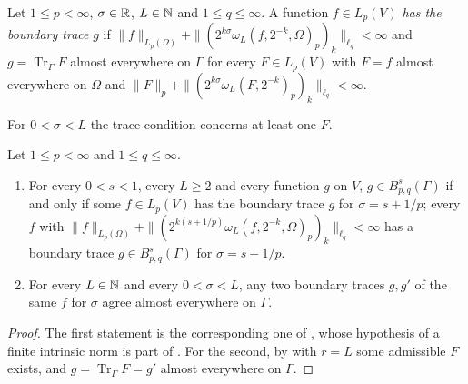 \begin{definition}
\label{def:boundary-trace-finite-norm}
\leanok
{}
Let $1 \leq p < \infty$, $\sigma \in \mathbb{R}$, $L \in \mathbb{N}$ and $1 \leq q \leq \infty$. A function
$f \in L_p(V)$ \emph{has the boundary trace} $g$ if
$\|f\|_{L_p(\Omega)} + \|(2^{k\sigma} \omega_L(f, 2^{-k}, \Omega)_p)_k\|_{\ell_q} < \infty$ and
$g = \operatorname{Tr}_\Gamma F$ almost everywhere on $\Gamma$ for every $F \in L_p(V)$ with
$F = f$ almost everywhere on $\Omega$ and
$\|F\|_p + \|(2^{k\sigma} \omega_L(F, 2^{-k})_p)_k\|_{\ell_q} < \infty$.
\end{definition}

For $0 < \sigma < L$ the trace condition concerns at least one $F$.

\begin{theorem}
\label{thm:boundary-trace-space-finite-norm}
\leanok
{}
Let $1 \leq p < \infty$ and $1 \leq q \leq \infty$.
\begin{enumerate}
  \item For every $0 < s < 1$, every $L \geq 2$ and every function $g$ on $V$,
    $g \in B^s_{p,q}(\Gamma)$ if and only if some $f \in L_p(V)$ has the boundary trace $g$
    for $\sigma = s + 1/p$; every $f$ with
    $\|f\|_{L_p(\Omega)} + \|(2^{k(s + 1/p)} \omega_L(f, 2^{-k}, \Omega)_p)_k\|_{\ell_q} < \infty$
    has a boundary trace $g \in B^s_{p,q}(\Gamma)$ for $\sigma = s + 1/p$.
  \item For every $L \in \mathbb{N}$ and every $0 < \sigma < L$, any two boundary traces $g, g'$ of the
    same $f$ for $\sigma$ agree almost everywhere on $\Gamma$.
\end{enumerate}
\end{theorem}

\begin{proof}
\leanok
The first statement is the corresponding one of , whose hypothesis
of a finite intrinsic norm is part of . For the second, by
 with $r = L$ some admissible $F$ exists, and
$g = \operatorname{Tr}_\Gamma F = g'$ almost everywhere on $\Gamma$.
\end{proof}

